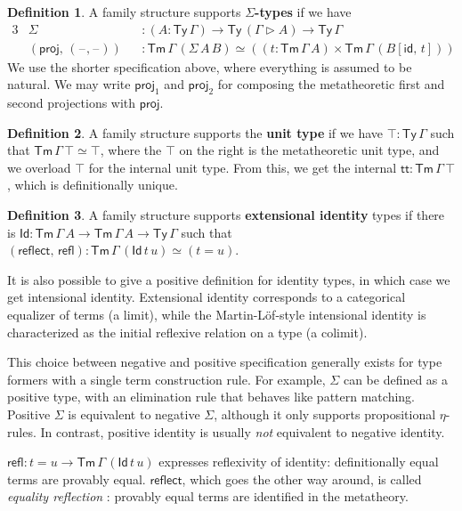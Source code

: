 \documentclass[12pt,a4paper,twoside,openany]{book}
\theoremstyle{remark}
\theoremstyle{definition}
\newtheorem{mydefinition}{Definition}
\newcommand{\refl}{\mathsf{refl}}
\newcommand{\reflect}{\mathsf{reflect}}
\newcommand{\id}{\mathsf{id}}
\newcommand{\Tm}{\mathsf{Tm}}
\newcommand{\Ty}{\mathsf{Ty}}
\newcommand{\Id}{\mathsf{Id}}
\newcommand{\proj}{\mathsf{proj}}
\renewcommand{\tt}{\mathsf{tt}}
\newcommand{\blank}{\mathord{\hspace{1pt}\text{--}\hspace{1pt}}}
\newcommand{\ext}{\triangleright}
\begin{document}
\begin{mydefinition}
A family structure supports \textbf{$\Sigma$-types} if we have
\begin{alignat*}{3}
  & \Sigma  &&: (A : \Ty\,\Gamma) \to \Ty\,(\Gamma\ext A) \to \Ty\,\Gamma\\
  & (\proj,\,(\blank,\blank)) &&: \Tm\,\Gamma\,(\Sigma\,A\,B) \simeq ((t : \Tm\,\Gamma\,A) \times \Tm\,\Gamma\,(B[\id,\,t]))
\end{alignat*}
We use the shorter specification above, where everything is assumed to be
natural. We may write $\proj_1$ and $\proj_2$ for composing the metatheoretic
first and second projections with $\proj$.
\end{mydefinition}

\begin{mydefinition}
A family structure supports the \textbf{unit type} if we have $\top : \Ty\,\Gamma$ such
that $\Tm\,\Gamma\,\top \simeq \top$, where the $\top$ on the right is the
metatheoretic unit type, and we overload $\top$ for the internal unit type.
From this, we get the internal $\tt : \Tm\,\Gamma\,\top$, which is
definitionally unique.
\end{mydefinition}

\begin{mydefinition}
A family structure supports \textbf{extensional identity} types if there is $\Id
: \Tm\,\Gamma\,A \to \Tm\,\Gamma\,A \to \Ty\,\Gamma$ such that
$(\reflect,\,\refl) : \Tm\,\Gamma\,(\Id\,t\,u) \simeq (t = u)$.
\end{mydefinition}

It is also possible to give a positive definition for identity types, in which
case we get intensional identity. Extensional identity corresponds to a
categorical equalizer of terms (a limit), while the Martin-Löf-style intensional
identity is characterized as the initial reflexive relation on a type (a
colimit).

This choice between negative and positive specification generally exists for
type formers with a single term construction rule. For example, $\Sigma$ can be
defined as a positive type, with an elimination rule that behaves like pattern
matching. Positive $\Sigma$ is equivalent to negative $\Sigma$, although it only
supports propositional $\eta$-rules. In contrast, positive identity is usually
\emph{not} equivalent to negative identity.

$\refl : t = u \to \Tm\,\Gamma\,(\Id\,t\,u)$ expresses reflexivity of identity:
definitionally equal terms are provably equal. $\reflect$, which goes the other
way around, is called \emph{equality reflection} \cite{TODO}: provably equal
terms are identified in the metatheory.
\end{document}
